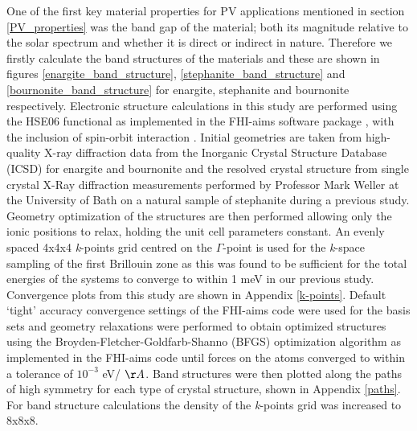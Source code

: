 One of the first key material properties for PV applications mentioned in section \ref{PV_properties} was the band gap of the material; both its magnitude relative to the solar spectrum and whether it is direct or indirect in nature. Therefore we firstly calculate the band structures of the materials and these are shown in figures \ref{enargite_band_structure}, \ref{stephanite_band_structure} and \ref{bournonite_band_structure} for enargite, stephanite and bournonite respectively.
Electronic structure calculations in this study are performed using the HSE06 functional \cite{HSE} as implemented in the FHI-aims software package \cite{aims, aims_hybrids, aims_parallel}, with the inclusion of spin-orbit interaction 
.
Initial geometries are taken from high-quality X-ray diffraction data from the Inorganic Crystal Structure Database (ICSD)\cite{icsd} for enargite and bournonite and the resolved crystal structure from single crystal X-Ray diffraction measurements performed by Professor Mark Weller at the University of Bath on a natural sample of stephanite during a previous study. Geometry optimization of the structures are then performed allowing only the ionic positions to relax, holding the unit cell parameters constant.
An evenly spaced 4x4x4 \textit{k}-points grid centred on the $\Gamma$-point is used for the \textit{k}-space sampling of the first Brillouin zone as this was found to be sufficient for the total energies of the systems to converge to within 1 meV in our previous study. Convergence plots from this study are shown in Appendix \ref{k-points}.
Default `tight' accuracy convergence settings of the FHI-aims code were used for the basis sets and geometry relaxations were performed to obtain optimized structures using the Broyden-Fletcher-Goldfarb-Shanno (BFGS) optimization algorithm as implemented in the FHI-aims code \cite{aims} until forces on the atoms converged to within a tolerance of $10^{-3}$ eV/ $\AA$. Band structures were then plotted along the paths of high symmetry for each type of crystal structure, shown in Appendix \ref{paths}. For band structure calculations the density of the \textit{k}-points grid was increased to 8x8x8.

